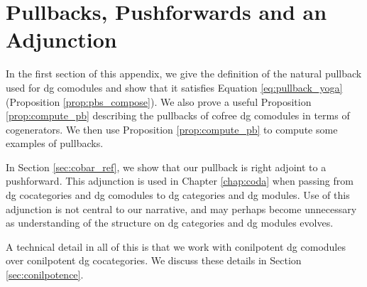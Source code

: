 \chapter{Pullbacks, Pushforwards and an Adjunction} \label{chap:pullbacks}
%
In the first section of this appendix, 
we give the definition 
of the natural pullback used for dg 
comodules and show that it satisfies 
Equation \ref{eq:pullback_yoga} 
(Proposition \ref{prop:pbs_compose}). We also prove 
a useful Proposition \ref{prop:compute_pb}
describing the pullbacks of cofree dg 
comodules in terms of cogenerators. 
We then use Proposition \ref{prop:compute_pb}
to compute some examples of pullbacks.

In Section \ref{sec:cobar_ref}, we show that our 
pullback is right adjoint to a  
pushforward. This adjunction is used in 
Chapter \ref{chap:coda} when passing from 
dg cocategories and dg comodules to dg 
categories and dg modules. Use of this 
adjunction is not central to our 
narrative, and may perhaps become 
unnecessary as understanding of the 
structure on dg categories and dg modules 
evolves.

A technical detail in all of this is that 
we work with conilpotent dg comodules over 
conilpotent dg cocategories. We discuss these 
details in Section \ref{sec:conilpotence}.
%



